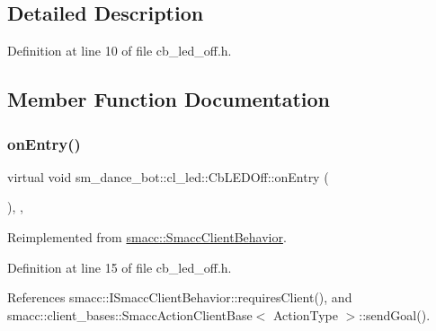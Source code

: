 \subsection{Detailed Description}


Definition at line 10 of file cb\+\_\+led\+\_\+off.\+h.



\subsection{Member Function Documentation}
\mbox{\label{classsm__dance__bot_1_1cl__led_1_1CbLEDOff_a3c0ed097db52baae1928a19936f09a83}} 
\subsubsection{\texorpdfstring{on\+Entry()}{onEntry()}}
{\footnotesize\ttfamily virtual void sm\+\_\+dance\+\_\+bot\+::cl\+\_\+led\+::\+Cb\+L\+E\+D\+Off\+::on\+Entry (\begin{DoxyParamCaption}{ }\end{DoxyParamCaption})\hspace{0.3cm}{\ttfamily [inline]}, {\ttfamily [override]}, {\ttfamily [virtual]}}



Reimplemented from \hyperlink{classsmacc_1_1SmaccClientBehavior_ad5d3e1f1697c3cfe66c94cadba948493}{smacc\+::\+Smacc\+Client\+Behavior}.



Definition at line 15 of file cb\+\_\+led\+\_\+off.\+h.



References smacc\+::\+I\+Smacc\+Client\+Behavior\+::requires\+Client(), and smacc\+::client\+\_\+bases\+::\+Smacc\+Action\+Client\+Base$<$ Action\+Type $>$\+::send\+Goal().


